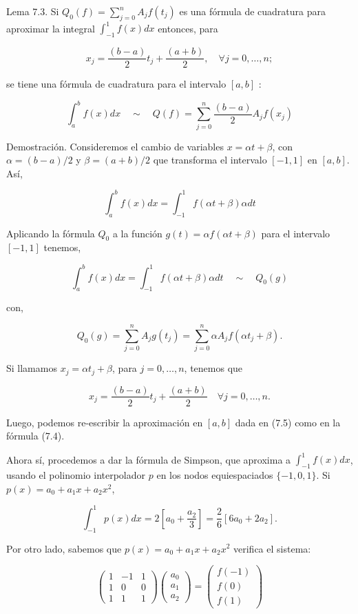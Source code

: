 \documentclass[10pt]{article}
\begin{document}
Lema 7.3. Si $Q_{0}(f)=\sum_{j=0}^{n} A_{j} f\left(t_{j}\right)$ es una fórmula de cuadratura para aproximar la integral $\int_{-1}^{1} f(x) d x$ entonces, para

$$
x_{j}=\frac{(b-a)}{2} t_{j}+\frac{(a+b)}{2}, \quad \forall j=0, \ldots, n ;
$$

se tiene una fórmula de cuadratura para el intervalo $[a, b]$ :


\begin{equation*}
\int_{a}^{b} f(x) d x \quad \sim \quad Q(f)=\sum_{j=0}^{n} \frac{(b-a)}{2} A_{j} f\left(x_{j}\right) \tag{7.4}
\end{equation*}


Demostración. Consideremos el cambio de variables $x=\alpha t+\beta$, con $\alpha=(b-a) / 2$ y $\beta=(a+b) / 2$ que transforma el intervalo $[-1,1]$ en $[a, b]$. Así,

$$
\int_{a}^{b} f(x) d x=\int_{-1}^{1} f(\alpha t+\beta) \alpha d t
$$

Aplicando la fórmula $Q_{0}$ a la función $g(t)=\alpha f(\alpha t+\beta)$ para el intervalo $[-1,1]$ tenemos,


\begin{equation*}
\int_{a}^{b} f(x) d x=\int_{-1}^{1} f(\alpha t+\beta) \alpha d t \quad \sim \quad Q_{0}(g) \tag{7.5}
\end{equation*}


con,

$$
Q_{0}(g)=\sum_{j=0}^{n} A_{j} g\left(t_{j}\right)=\sum_{j=0}^{n} \alpha A_{j} f\left(\alpha t_{j}+\beta\right) .
$$

Si llamamos $x_{j}=\alpha t_{j}+\beta$, para $j=0, \ldots, n$, tenemos que

$$
x_{j}=\frac{(b-a)}{2} t_{j}+\frac{(a+b)}{2} \quad \forall j=0, \ldots, n .
$$

Luego, podemos re-escribir la aproximación en $[a, b]$ dada en (7.5) como en la fórmula (7.4).

Ahora sí, procedemos a dar la fórmula de Simpson, que aproxima a $\int_{-1}^{1} f(x) d x$, usando el polinomio interpolador $p$ en los nodos equiespaciados $\{-1,0,1\}$. Si $p(x)=a_{0}+a_{1} x+a_{2} x^{2}$,

$$
\int_{-1}^{1} p(x) d x=2\left[a_{0}+\frac{a_{2}}{3}\right]=\frac{2}{6}\left[6 a_{0}+2 a_{2}\right] .
$$

Por otro lado, sabemos que $p(x)=a_{0}+a_{1} x+a_{2} x^{2}$ verifica el sistema:

$$
\left(\begin{array}{ccc}
1 & -1 & 1 \\
1 & 0 & 0 \\
1 & 1 & 1
\end{array}\right)\left(\begin{array}{l}
a_{0} \\
a_{1} \\
a_{2}
\end{array}\right)=\left(\begin{array}{c}
f(-1) \\
f(0) \\
f(1)
\end{array}\right)
$$
\end{document}
